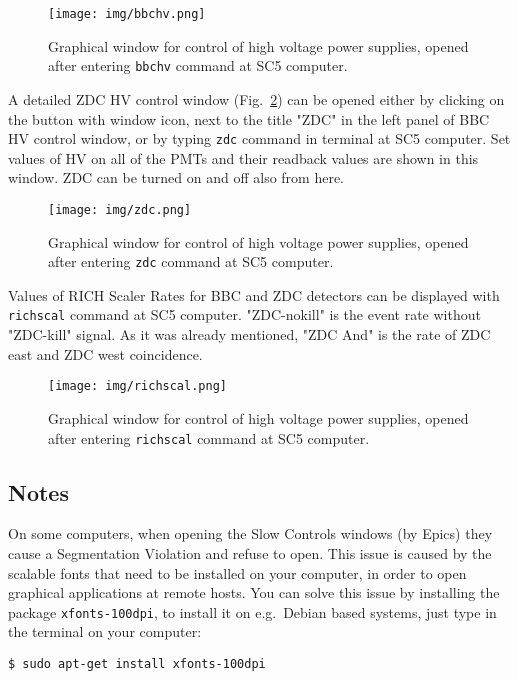  
\begin{figure}[htb]
  \begin{center}
    \texttt{[image: img/bbchv.png]}
  \end{center}
  \caption{Graphical window for control of high voltage power supplies, opened after entering \texttt{bbchv} command at SC5 computer.}
\label{bbchv}
\end{figure}

A detailed ZDC HV control window (Fig.~\ref{zdcwindow}) can be opened either by clicking on the button with window icon, next to the title "ZDC" in the left panel of BBC HV control window, or by typing \texttt{zdc} command in terminal at SC5 computer. Set values of HV on all of the PMTs and their readback values are shown in this window.  ZDC can be turned on and off also from here.

\begin{figure}[htb]
  \begin{center}
    \texttt{[image: img/zdc.png]}
  \end{center}
  \caption{Graphical window for control of high voltage power supplies, opened after entering \texttt{zdc} command at SC5 computer.}
\label{zdcwindow}
\end{figure}

Values of RICH Scaler Rates for BBC and ZDC detectors can be displayed with \texttt{richscal} command at SC5 computer. "ZDC-nokill" is the event rate without "ZDC-kill" signal. As it was already mentioned, "ZDC And" is the rate of ZDC east and ZDC west coincidence.

\begin{figure}[htb]
  \begin{center}
    \texttt{[image: img/richscal.png]}
  \end{center}
  \caption{Graphical window for control of high voltage power supplies, opened after entering \texttt{richscal} command at SC5 computer.}
\label{richscal}
\end{figure}


\subsection{Notes}
On some computers, when opening the Slow Controls windows (by Epics) they cause a Segmentation Violation and refuse to open. This issue is caused by the scalable fonts that need to be installed on your computer, in order to open graphical applications at remote hosts.
You can solve this issue by installing the package \texttt{xfonts-100dpi}, to install it on e.g.\ Debian based systems, just type in the terminal on your computer:
\begin{verbatim}
$ sudo apt-get install xfonts-100dpi
\end{verbatim}

